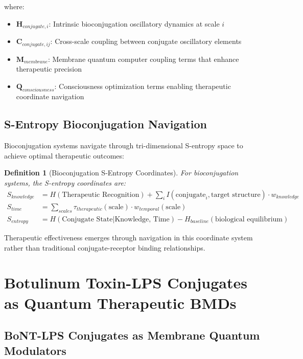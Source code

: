 \documentclass[12pt,a4paper]{article}
\newtheorem{definition}{Definition}
\begin{document}
where:
\begin{itemize}
\item $\mathbf{H}_{conjugate,i}$: Intrinsic bioconjugation oscillatory dynamics at scale $i$
\item $\mathbf{C}_{conjugate,ij}$: Cross-scale coupling between conjugate oscillatory elements
\item $\mathbf{M}_{membrane}$: Membrane quantum computer coupling terms that enhance therapeutic precision
\item $\mathbf{Q}_{consciousness}$: Consciousness optimization terms enabling therapeutic coordinate navigation
\end{itemize}

\subsection{S-Entropy Bioconjugation Navigation}

Bioconjugation systems navigate through tri-dimensional S-entropy space to achieve optimal therapeutic outcomes:

\begin{definition}[Bioconjugation S-Entropy Coordinates]
For bioconjugation systems, the S-entropy coordinates are:
\begin{align}
S_{knowledge} &= H(\text{Therapeutic Recognition}) + \sum_i I(\text{conjugate}_i, \text{target structure}) \cdot w_{knowledge} \\
S_{time} &= \sum_{scales} \tau_{therapeutic}(\text{scale}) \cdot w_{temporal}(\text{scale}) \\
S_{entropy} &= H(\text{Conjugate State}|\text{Knowledge, Time}) - H_{baseline}(\text{biological equilibrium})
\end{align}
\end{definition}

Therapeutic effectiveness emerges through navigation in this coordinate system rather than traditional conjugate-receptor binding relationships.

\section{Botulinum Toxin-LPS Conjugates as Quantum Therapeutic BMDs}

\subsection{BoNT-LPS Conjugates as Membrane Quantum Modulators}
\end{document}
